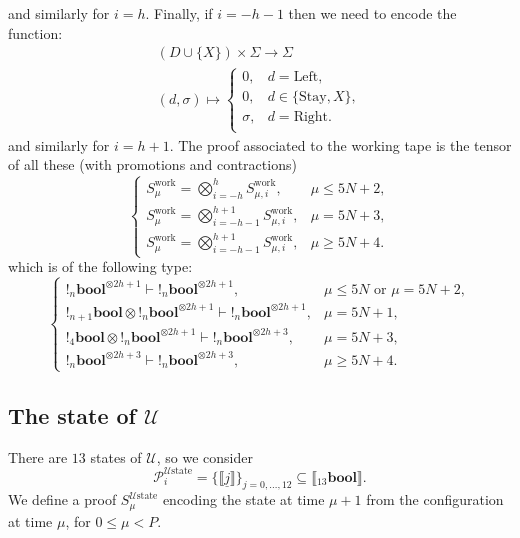 \documentclass[english,letter paper,12pt,reqno]{article}
\theoremstyle{definition}
\newcommand{\lto}{\longrightarrow}
\begin{document}
and similarly for $i = h$. Finally, if $i = -h-1$ then we need to encode the function:
\begin{gather*}
    (D \cup \{X\}) \times \Sigma \lto \Sigma\\
    (d, \sigma) \longmapsto
    \begin{cases}
        0, & d = \text{Left},\\
        0, & d \in \{\text{Stay},X\},\\
        \sigma, & d = \text{Right}.\\
    \end{cases}
\end{gather*}
and similarly for $i = h+1$. The proof associated to the working tape is the tensor of all these (with promotions and contractions)
\begin{equation}
    \begin{cases}
        S^{\text{work}}_{\mu} = \bigotimes_{i=-h}^{h} S^{\text{work}}_{\mu,i},& \mu \leq 5N+2,\\
        S^{\text{work}}_{\mu} = \bigotimes_{i=-h-1}^{h+1} S^{\text{work}}_{\mu,i},& \mu = 5N+3,\\
        S^{\text{work}}_{\mu} = \bigotimes_{i=-h-1}^{h+1} S^{\text{work}}_{\mu,i},& \mu \geq 5N+4.
    \end{cases}
\end{equation}
which is of the following type:
\begin{equation}
    \begin{cases}
        {!}{}_{n}\textbf{bool}^{\otimes 2h+1} \vdash {!}{}_{n}\textbf{bool}^{\otimes 2h+1},& \mu \leq 5N \text{ or } \mu = 5N+2,\\
        {!}{}_{n+1}\textbf{bool} \otimes {!}{}_{n}\textbf{bool}^{\otimes 2h+1} \vdash {!}{}_{n}\textbf{bool}^{\otimes 2h+1},& \mu = 5N+1,\\
        {!}{}_{4}\textbf{bool} \otimes {!}{}_{n}\textbf{bool}^{\otimes 2h+1} \vdash {!}{}_{n}\textbf{bool}^{\otimes 2h+3},& \mu = 5N+3,\\
        {!}{}_{n}\textbf{bool}^{\otimes 2h+3} \vdash {!}{}_{n}\textbf{bool}^{\otimes 2h+3},& \mu \geq 5N+4.
    \end{cases}
\end{equation}

\subsection{The state of $\mathcal{U}$}

There are $13$ states of $\mathcal{U}$, so we consider
\begin{equation}
    \mathcal{P}^{\mathcal{U}\text{state}}_i = \{\llbracket \underline{j}\rrbracket\}_{j = 0, \ldots, 12} \subseteq \llbracket {}_{13}\textbf{bool}\rrbracket.
\end{equation}
We define a proof $S^{\mathcal{U}\text{state}}_\mu$ encoding the state at time $\mu+1$ from the configuration at time $\mu$, for $0 \leq \mu < P$.\\
\end{document}
